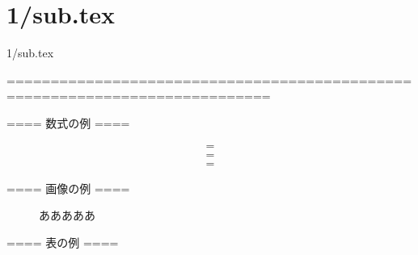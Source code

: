 \documentclass[12pt,a4j]{jarticle}
\begin{document}
\fi
\section{1/sub.tex}
1/sub.tex






============================================================================

==== 数式の例 ====

\begin{eqnarray}
	&	=	&	\\
	&	=	&	\nonumber \\
	&	=	&	
\end{eqnarray}

==== 画像の例 ==== 
\begin{figure}[H]
	\centering
	\caption{あああああ}
	\label{aaaaaa}
\end{figure}


==== 表の例 ====
\end{document}
